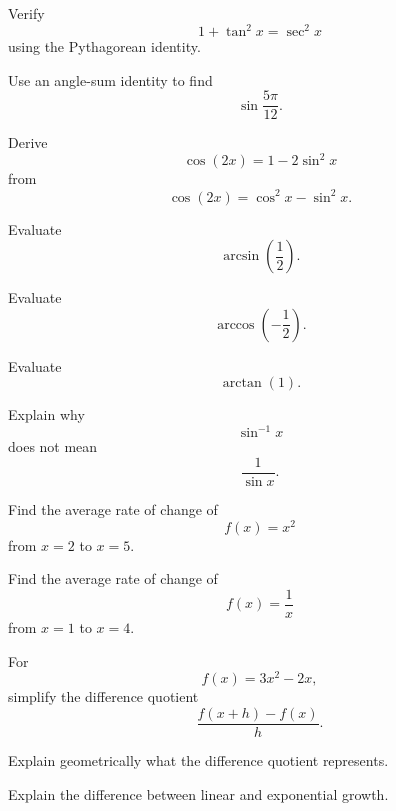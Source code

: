 \begin{exercise}[1]
Verify
\[ 1+\tan^2x=\sec^2x \]
using the Pythagorean identity.
\end{exercise}

\begin{exercise}[2]
Use an angle-sum identity to find
\[ \sin\frac{5\pi}{12}. \]
\end{exercise}

\begin{exercise}[2]
Derive
\[ \cos(2x)=1-2\sin^2x \]
from
\[ \cos(2x)=\cos^2x-\sin^2x. \]
\end{exercise}

\begin{exercise}[1]
Evaluate
\[ \arcsin\left(\frac12\right). \]
\end{exercise}

\begin{exercise}[1]
Evaluate
\[ \arccos\left(-\frac12\right). \]
\end{exercise}

\begin{exercise}[1]
Evaluate
\[ \arctan(1). \]
\end{exercise}

\begin{exercise}[2]
Explain why
\[ \sin^{-1}x \]
does not mean
\[ \frac1{\sin x}. \]
\end{exercise}

\begin{exercise}[1]
Find the average rate of change of
\[ f(x)=x^2 \]
from \(x=2\) to \(x=5\).
\end{exercise}

\begin{exercise}[2]
Find the average rate of change of
\[ f(x)=\frac1x \]
from \(x=1\) to \(x=4\).
\end{exercise}

\begin{exercise}[2]
For
\[ f(x)=3x^2-2x, \]
simplify the difference quotient
\[ \frac{f(x+h)-f(x)}{h}. \]
\end{exercise}

\begin{exercise}[2]
Explain geometrically what the difference quotient represents.
\end{exercise}

\begin{exercise}[2]
Explain the difference between linear and exponential growth.
\end{exercise}

